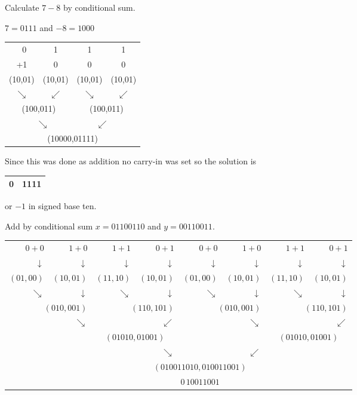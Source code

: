 \begin{example}
    Calculate $7-8$ by conditional sum.

    {\color{ans}

    $7=0111$ and $-8=1000$

    \begin{tabular}{cccc}
    $\;$ 0       & 1          & 1          & 1          \\
      +1         & 0          & 0          & 0          \\ \hline
      (10,01)    & (10,01)    & (10,01)    & (10,01)    \\
      $\searrow$ & $\swarrow$ & $\searrow$ & $\swarrow$ \\
      \multicolumn{2}{c}{(100,011)} & \multicolumn{2}{c}{(100,011)} \\
      \multicolumn{2}{c}{$\quad\searrow$} & \multicolumn{2}{c}{$\swarrow\quad$} \\
      \multicolumn{4}{c}{(10000,01111)} \\
    \end{tabular}

    Since this was done as addition no carry-in was set so the solution is \begin{tabular}{r|l} 0 & 1111 \\ \hline \end{tabular} or $-1$ in signed base ten.

    }
\end{example}


\begin{example}
Add by conditional sum $x=01100110$ and $y=00110011$.

{\color{ans}
\noindent
\begin{tabular}{rrrrrrrr}
$0+0$ & $1+0$ & $1+1$ & $0+1$ & $0+0$ & $1+0$ & $1+1$ & $0+1$ \\
$\downarrow$ & $\downarrow$ & $\downarrow$ & $\downarrow$ & $\downarrow$ & $\downarrow$ & $\downarrow$ & $\downarrow$ \\
$(01,00)$ & $(10,01)$ & $(11,10)$ & $(10,01)$ & $(01,00)$ & $(10,01)$ & $(11,10)$ & $(10,01)$ \\
$\searrow$ & $\downarrow$ & $\searrow$ & $\downarrow$ & $\searrow$ & $\downarrow$ & $\searrow$ & $\downarrow$ \\
\multicolumn{2}{r}{$(010,001)$} & \multicolumn{2}{r}{$(110,101)$} & \multicolumn{2}{r}{$(010,001)$} & \multicolumn{2}{r}{$(110,101)$} \\
& $\searrow$ & & $\swarrow$ & & $\searrow$ & & $\swarrow$  \\
&  & \multicolumn{2}{c}{$(01010,01001)$} &  &  & \multicolumn{2}{c}{$(01010,01001)$ }  \\
&  &  & $\searrow$ &  & $\swarrow$ &  &  \\
&  &  & \multicolumn{3}{c}{$(010011010,010011001)$} &  &  \\
&  &  & \multicolumn{3}{c}{$0 \, 10011001$} &  &  \\
\end{tabular}
}
\end{example}

